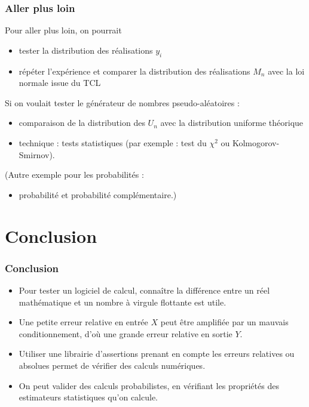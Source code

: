 \documentclass{beamer}
\begin{document}
\begin{frame}[containsverbatim]
\frametitle{Aller plus loin}

Pour aller plus loin, on pourrait 
\begin{itemize}
\item tester la distribution des réalisations $y_i$
\item répéter l'expérience et comparer la distribution des réalisations $M_n$ 
avec la loi normale issue du TCL
\end{itemize}

Si on voulait tester le générateur de nombres pseudo-aléatoires :
\begin{itemize}
\item comparaison de la distribution des $U_n$ avec la distribution 
uniforme théorique
\item technique : tests statistiques (par exemple : test du $\chi^2$ ou 
Kolmogorov-Smirnov).
\end{itemize}

(Autre exemple pour les probabilités :  
\begin{itemize}
\item probabilité et probabilité complémentaire.)
\end{itemize}

\end{frame}


\section{Conclusion}

\begin{frame}
\frametitle{Conclusion}

\begin{itemize}
\item Pour tester un logiciel de calcul, connaître la 
différence entre un réel mathématique et un nombre à virgule 
flottante est utile. 
\item Une petite erreur relative en entrée $X$ peut être amplifiée par un 
mauvais conditionnement, d'où une grande erreur relative en sortie $Y$. 
\item Utiliser une librairie d'assertions prenant en compte 
les erreurs relatives ou absolues permet de vérifier des calculs 
numériques. 
\item On peut valider des calculs probabilistes, en vérifiant les propriétés 
des estimateurs statistiques qu'on calcule.
\end{itemize}

\end{frame}
\end{document}
